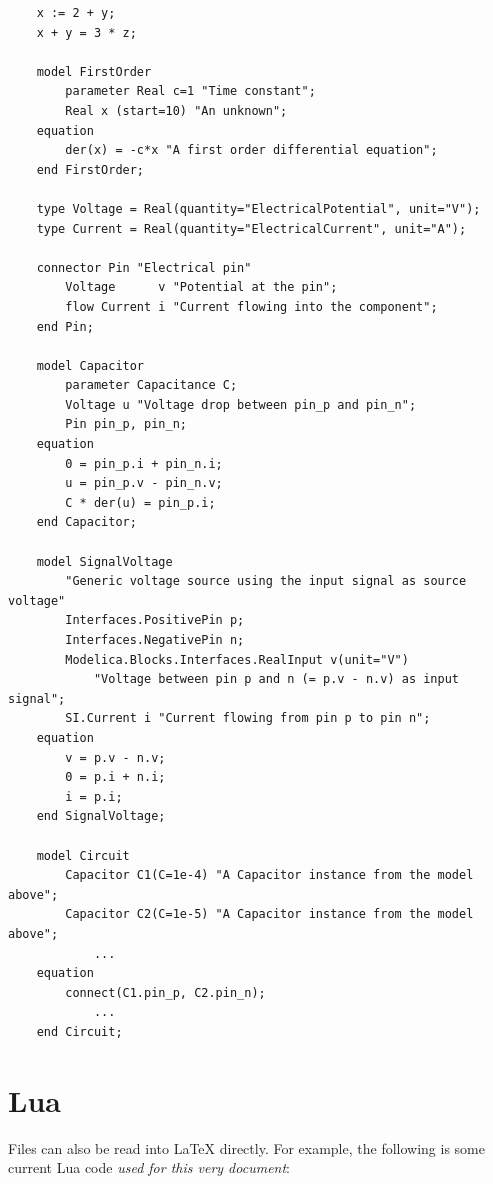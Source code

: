 \begin{verbatim}
    x := 2 + y;
    x + y = 3 * z;

    model FirstOrder
        parameter Real c=1 "Time constant";
        Real x (start=10) "An unknown";
    equation
        der(x) = -c*x "A first order differential equation";
    end FirstOrder;

    type Voltage = Real(quantity="ElectricalPotential", unit="V");
    type Current = Real(quantity="ElectricalCurrent", unit="A");

    connector Pin "Electrical pin"
        Voltage      v "Potential at the pin";
        flow Current i "Current flowing into the component";
    end Pin;

    model Capacitor
        parameter Capacitance C;
        Voltage u "Voltage drop between pin_p and pin_n";
        Pin pin_p, pin_n;
    equation
        0 = pin_p.i + pin_n.i;
        u = pin_p.v - pin_n.v;
        C * der(u) = pin_p.i;
    end Capacitor;

    model SignalVoltage
        "Generic voltage source using the input signal as source voltage"
        Interfaces.PositivePin p;
        Interfaces.NegativePin n;
        Modelica.Blocks.Interfaces.RealInput v(unit="V")
            "Voltage between pin p and n (= p.v - n.v) as input signal";
        SI.Current i "Current flowing from pin p to pin n";
    equation
        v = p.v - n.v;
        0 = p.i + n.i;
        i = p.i;
    end SignalVoltage;

    model Circuit
        Capacitor C1(C=1e-4) "A Capacitor instance from the model above";
        Capacitor C2(C=1e-5) "A Capacitor instance from the model above";
            ...
    equation
        connect(C1.pin_p, C2.pin_n);
            ...
    end Circuit;
\end{verbatim}

\section{Lua}

Files can also be read into \LaTeX{} directly.
For example, the following is some current Lua code \emph{used for this very document}:
\inputminted{lua}{../../lua/git-metadata.lua}
